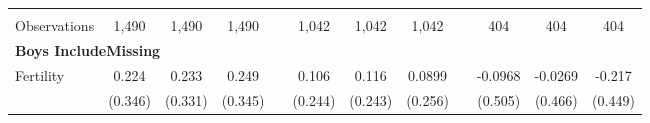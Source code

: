 \begin{landscape}
\begin{table}[htpb!]
\begin{center}
\begin{tabular}{lcccp{2mm}cccp{2mm}ccc}
\begin{footnotesize}\end{footnotesize}&\begin{footnotesize}\end{footnotesize}&\begin{footnotesize}\end{footnotesize}&\begin{footnotesize}\end{footnotesize}&\begin{footnotesize}\end{footnotesize}&\begin{footnotesize}\end{footnotesize}&\begin{footnotesize}\end{footnotesize}&\begin{footnotesize}\end{footnotesize}&\begin{footnotesize}\end{footnotesize}&\begin{footnotesize}\end{footnotesize}&\begin{footnotesize}\end{footnotesize}&\begin{footnotesize}\end{footnotesize}\\Observations&1,490&1,490&1,490&&1,042&1,042&1,042&&404&404&404\\
\multicolumn{12}{l}{\textbf{Boys IncludeMissing}}\\ 
Fertility&0.224&0.233&0.249&&0.106&0.116&0.0899&&-0.0968&-0.0269&-0.217\\
&(0.346)&(0.331)&(0.345)&&(0.244)&(0.243)&(0.256)&&(0.505)&(0.466)&(0.449)\\

\end{tabular}
\end{center}
\end{table}
\end{landscape}
